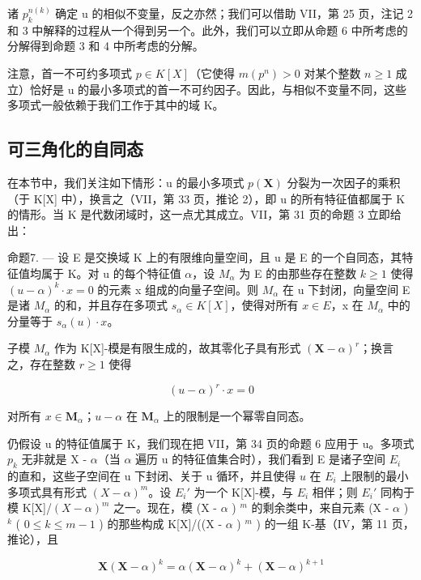 诸 \(p_{k}^{n(k)}\) 确定 u 的相似不变量，反之亦然；我们可以借助 VII，第 25 页，注记 2 和 3 中解释的过程从一个得到另一个。此外，我们可以立即从命题 6 中所考虑的分解得到命题 3 和 4 中所考虑的分解。

注意，首一不可约多项式 \(p \in K[X]\)（它使得 \(m(p^{n}) > 0\) 对某个整数 \(n \geqslant 1\) 成立）恰好是 u 的最小多项式的首一不可约因子。因此，与相似不变量不同，这些多项式一般依赖于我们工作于其中的域 K。

\subsection{可三角化的自同态}

在本节中，我们关注如下情形：u 的最小多项式 \(p(\mathbf{X})\) 分裂为一次因子的乘积（于 K{[}X{]} 中），换言之（VII，第 33 页，推论 2），即 u 的所有特征值都属于 K 的情形。当 K 是代数闭域时，这一点尤其成立。VII，第 31 页的命题 3 立即给出：

命题7. --- 设 E 是交换域 K 上的有限维向量空间，且 u 是 E 的一个自同态，其特征值均属于 K。对 u 的每个特征值 \(\alpha\)，设 \(M_{\alpha}\) 为 E 的由那些存在整数 \(k \geqslant 1\) 使得 \((u - \alpha)^{k} \cdot x = 0\) 的元素 x 组成的向量子空间。则 \(M_{\alpha}\) 在 u 下封闭，向量空间 E 是诸 \(M_{\alpha}\) 的和，并且存在多项式 \(s_{\alpha} \in K[X]\)，使得对所有 \(x \in E\)，x 在 \(M_{\alpha}\) 中的分量等于 \(s_{\alpha}(u) \cdot x\)。

子模 \(M_{\alpha}\) 作为 K{[}X{]}-模是有限生成的，故其零化子具有形式 \((\mathbf{X}-\alpha)^{r}\)；换言之，存在整数 \(r \geqslant 1\) 使得

\[
(u - \alpha) ^ {r} \cdot x = 0
\]

对所有 \(x \in \mathbf{M}_{\alpha}\)；\(u - \alpha\) 在 \(\mathbf{M}_{\alpha}\) 上的限制是一个幂零自同态。

仍假设 u 的特征值属于 K，我们现在把 VII，第 34 页的命题 6 应用于 u。多项式 \(p_{k}\) 无非就是 X - \(\alpha\)（当 \(\alpha\) 遍历 u 的特征值集合时），我们看到 E 是诸子空间 \(E_{i}\) 的直和，这些子空间在 u 下封闭、关于 u 循环，并且使得 \(u\) 在 \(E_i\) 上限制的最小多项式具有形式 \((X - \alpha)^m\)。设 \(E_i'\) 为一个 K{[}X{]}-模，与 \(E_i\) 相伴；则 \(E_i'\) 同构于模 K{[}X{]}/\((X - \alpha)^{m}\) 之一。现在，模 (X - \(\alpha\) ) \(^m\) 的剩余类中，来自元素 (X - \(\alpha\) ) \(^k\) ( \(0 \leqslant k \leqslant m - 1\) ) 的那些构成 K{[}X{]}/((X - \(\alpha\) ) \(^m\) ) 的一组 K-基（IV，第 11 页，推论），且

\[
\mathbf {X} (\mathbf {X} - \alpha) ^ {k} = \alpha (\mathbf {X} - \alpha) ^ {k} + (\mathbf {X} - \alpha) ^ {k + 1}
\]

